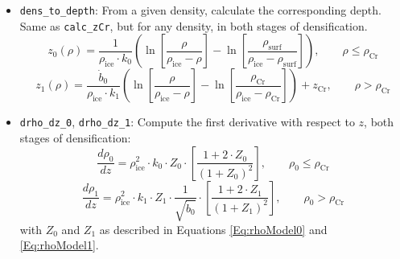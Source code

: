 \documentclass[../../CompleteThesis/Complete_1stDraft.tex]{subfiles}
\begin{document}
\begin{itemize}
	\item \lstinline[columns=fixed]|dens_to_depth|: From a given density, calculate the corresponding depth. Same as \lstinline[columns=fixed]|calc_zCr|, but for any density, in both stages of densification.
	\begin{equation}
		z_0(\rho) = \frac{1}{\rho_{\text{ice}}\cdot k_0}\left(\ln\left[\frac{\rho}{\rho_{\text{ice}} - \rho}\right] - \ln\left[\frac{\rho_{\text{surf}}}{\rho_{\text{ice}} - \rho_{\text{surf}}}\right]\right), \qquad \rho \leq \rho_{\text{Cr}}
		\label{Eq:rhoToDepth_0}
	\end{equation}	
	\begin{equation}
		z_1(\rho) = \frac{\dot{b}_0}{\rho_{\text{ice}}\cdot k_1}\left(\ln\left[\frac{\rho}{\rho_{\text{ice}} - \rho}\right] - \ln\left[\frac{\rho_{\text{Cr}}}{\rho_{\text{ice}} - \rho_{\text{Cr}}}\right]\right) + z_{\text{Cr}}, \qquad \rho > \rho_{\text{Cr}}
		\label{Eq:rhoToDepth_1}
	\end{equation}		
	
	\item \lstinline[columns=fixed]|drho_dz_0|, \lstinline[columns=fixed]|drho_dz_1|: Compute the first derivative with respect to $z$, both stages of densification:
	\begin{equation}
		\frac{d\rho_0}{dz} = \rho_{\text{ice}}^2\cdot k_0 \cdot Z_0\cdot \left[\frac{1 + 2\cdot Z_0}{(1 + Z_0)^2}\right], \qquad \rho_0 \leq \rho_{\text{Cr}}
		\label{Eq:drho_dt_0}
	\end{equation}
	\begin{equation}
		\frac{d\rho_1}{dz} = \rho_{\text{ice}}^2\cdot k_1 \cdot Z_1\cdot \frac{1}{\sqrt{\dot{b}_0}}\cdot \left[\frac{1 + 2\cdot Z_1}{(1 + Z_1)^2}\right], \qquad \rho_0 > \rho_{\text{Cr}}
		\label{Eq:drho_dt_1}
	\end{equation}
	with $Z_0$ and $Z_1$ as described in Equations \ref{Eq:rhoModel0} and \ref{Eq:rhoModel1}.
	

\end{itemize}
\end{document}
